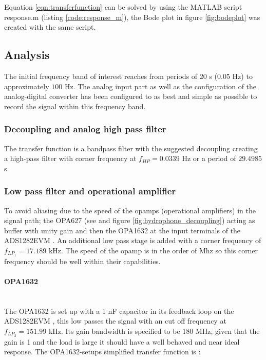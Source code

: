 \documentclass[a4paper]{article}
\begin{document}
\begin{multicols}{2}
Equation \ref{eqn:transferfunction} can be solved by using the MATLAB
script response.m (listing \ref{code:response_m}), the Bode plot in figure \ref{fig:bodeplot} was created with the same script.

\subsection{Analysis}
The initial frequency band of interest reaches
from periods of 20 s (0.05 Hz) to approximately $100$ Hz. The analog input part as
well as the configuration of the analog-digital converter has been
configured to as best and simple as possible to record the signal
within this frequency band.

\subsubsection{Decoupling and analog high pass filter}
The transfer function is a bandpass filter with
the suggested decoupling creating a high-pass filter with corner
frequency at $f_{HP} = 0.0339$ Hz or a period of $29.4985$ s.

\subsubsection{Low pass filter and operational amplifier}

To avoid aliasing due to the speed of the opamps (operational
amplifiers) in the signal path; the OPA627 (see \cite{opa627_ds} and
figure \ref{fig:hydrophone_decoupling}) acting as buffer with
unity gain and then the OPA1632 \cite{opa1632_ds} at the input terminals
of the ADS1282EVM \cite{ads1282evm_ds}.
An additional low pass stage is added with a corner frequency of
$f_{LP_1} = 17.189 $ kHz. The speed of the opamp is in the order of Mhz
so this corner frequency should be well within their capabilities.

\paragraph{OPA1632} \ \\
The OPA1632 \cite{opa1632_ds} is set up with a 1 nF capacitor in its
feedback loop on the ADS1282EVM \cite{ads1282evm_ds}, this low passes
the signal with an cut off frequency at $f_{LP_2} = 151.99$ kHz. Its
gain bandwidth is specified to be 180 MHz, given that the gain is 1 and
the load is large it should have a well behaved and near ideal response. The
OPA1632-setups simplified transfer function is \cite{fully_diff_opamps}:


\end{multicols}
\end{document}
